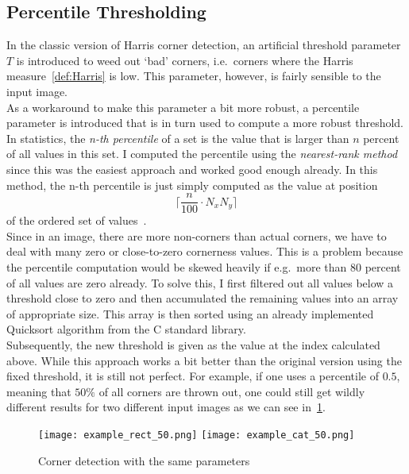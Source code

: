 \subsection{Percentile Thresholding}\label{sub:Percentile}
In the classic version of Harris corner detection, an artificial threshold parameter $T$
is introduced to weed out `bad' corners, i.e.\ corners where the \linebreak 
Harris measure~\eqref{def:Harris} is low. 
This parameter, however, is fairly sensible to the input image.\\
As a workaround to make this parameter a bit more robust, a percentile
parameter is introduced that is in turn used to compute a more robust threshold.\\
In statistics, the \textit{n-th percentile} of a set is the value that is larger than $n$ percent
of all values in this set.
I computed the percentile using the \textit{nearest-rank method} since this was the easiest
approach and worked good enough already. In this method, the n-th percentile is just simply
computed as the value at position 
\[
\lceil \frac{n}{100}\cdot N_{x}N_{y}\rceil
\] 
of the ordered set of values~\cite{percentile}.\\
Since in an image, there are more non-corners than actual corners, we have to deal with many zero
or close-to-zero cornerness values. This is a problem because the percentile computation would be skewed
heavily if e.g.\ more than 80 percent of all values are zero already. To solve this, I first filtered
out all values below a threshold close to zero and then accumulated the remaining values into an
array of appropriate size. This array is then sorted using an already implemented Quicksort
algorithm from the C standard library.\\
Subsequently, the new threshold is given as the value at
the index calculated above.
While this approach works a bit better than the original version using the fixed threshold, it is
still not perfect. For example, if one uses a percentile of $0.5$, meaning that 
$50\%$ of all corners are thrown out, one could still get wildly different results 
for two different input images as we can see in~\ref{fig:PercExample}.
\begin{figure}[h!]
    \centering
    \texttt{[image: example\_rect\_50.png]}
    \texttt{[image: example\_cat\_50.png]}
    \caption{Corner detection with the same parameters}%
    \label{fig:PercExample}
\end{figure}\\
